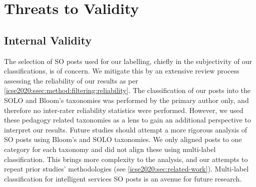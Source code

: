 \section{Threats to Validity}
\label{icse2020:sec:limitations}

\subsection{Internal Validity}
The selection of SO posts used for our labelling, chiefly in the subjectivity of our classifications, is of concern. We mitigate this by an extensive review process assessing the reliability of our results as per \cref{icse2020:ssec:method:filtering:reliability}. 
The classification of our posts into the SOLO and Bloom's taxonomies was performed by the primary author only, and therefore no inter-rater reliability statistics were performed. However, we used these pedagogy related taxonomies as a lens to gain an additional perspective to interpret our results. Future studies should attempt a more rigorous analysis of SO posts using Bloom's and SOLO taxonomies.
We only aligned posts to one category for each taxonomy and did not align these using multi-label classification. This brings more complexity to the analysis, and our attempts to repeat prior studies' methodologies (see \cref{icse2020:sec:related-work}). Multi-label classification for intelligent services SO posts is an avenue for future research.

